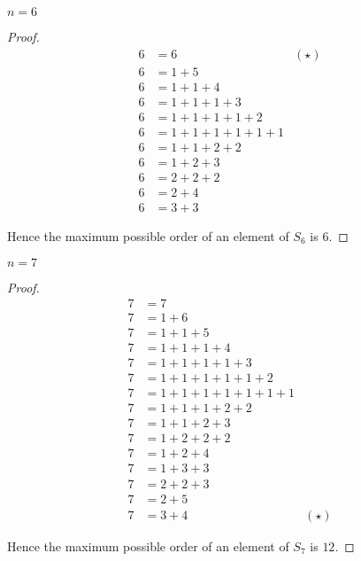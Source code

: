 \begin{exercise}
    $n = 6$
\end{exercise}

\begin{proof}
    \begin{align*}
        6 & = 6                     & (\star) \\
        6 & = 1 + 5                           \\
        6 & = 1 + 1 + 4                       \\
        6 & = 1 + 1 + 1 + 3                   \\
        6 & = 1 + 1 + 1 + 1 + 2               \\
        6 & = 1 + 1 + 1 + 1 + 1 + 1           \\
        6 & = 1 + 1 + 2 + 2                   \\
        6 & = 1 + 2 + 3                       \\
        6 & = 2 + 2 + 2                       \\
        6 & = 2 + 4                           \\
        6 & = 3 + 3
    \end{align*}

    Hence the maximum possible order of an element of $S_{6}$ is $6$.
\end{proof}

\begin{exercise}
    $n = 7$
\end{exercise}

\begin{proof}
    \begin{align*}
        7 & = 7                                   \\
        7 & = 1 + 6                               \\
        7 & = 1 + 1 + 5                           \\
        7 & = 1 + 1 + 1 + 4                       \\
        7 & = 1 + 1 + 1 + 1 + 3                   \\
        7 & = 1 + 1 + 1 + 1 + 1 + 2               \\
        7 & = 1 + 1 + 1 + 1 + 1 + 1 + 1           \\
        7 & = 1 + 1 + 1 + 2 + 2                   \\
        7 & = 1 + 1 + 2 + 3                       \\
        7 & = 1 + 2 + 2 + 2                       \\
        7 & = 1 + 2 + 4                           \\
        7 & = 1 + 3 + 3                           \\
        7 & = 2 + 2 + 3                           \\
        7 & = 2 + 5                               \\
        7 & = 3 + 4                     & (\star)
    \end{align*}

    Hence the maximum possible order of an element of $S_{7}$ is $12$.
\end{proof}

